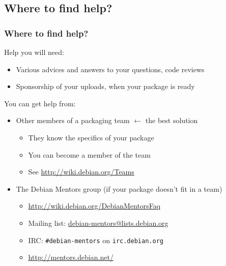 \documentclass[10pt,final]{beamer}
\begin{document}
\subsection{Where to find help?}
\begin{frame}
\frametitle{Where to find help?}
Help you will need:
\begin{itemize}
	\item Various advices and answers to your questions, code reviews
	\item Sponsorship of your uploads, when your package is ready
\end{itemize}
\br
You can get help from:
\begin{itemize}
	\item Other members of a packaging team $\leftarrow$ the best solution
		\begin{itemize}
			\item They know the specifics of your package
			\item You can become a member of the team
			\item See \url{http://wiki.debian.org/Teams}
		\end{itemize}
	\hbr
	\item The Debian Mentors group (if your package doesn't fit in a team)
		\begin{itemize}
			\item \url{http://wiki.debian.org/DebianMentorsFaq}
			\item Mailing list: \url{debian-mentors@lists.debian.org}
			\item IRC: \texttt{\#debian-mentors} on \texttt{irc.debian.org}
			\item \url{http://mentors.debian.net/}
		\end{itemize}
\end{itemize}
\end{frame}
\end{document}
